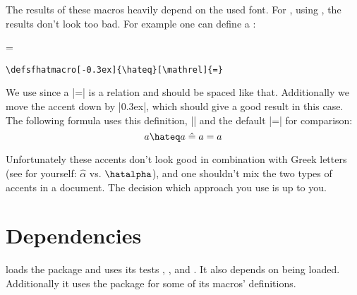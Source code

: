 The results of these macros heavily depend on the used font. For
, using , the results don't look too bad. For
example one can define a :

\begingroup
{}\hateq[\mathrel]=
\begin{verbatim}
\defsfhatmacro[-0.3ex]{\hateq}[\mathrel]{=}
\end{verbatim}%
We use  since a |=| is a relation and should be spaced like that.
Additionally we move the accent down by |0.3ex|, which should give a good result
in this case. The following formula uses this  definition,
|\mathrel{\hat{=}}| and the default |=| for comparison:
\begin{equation*}
  a\hateq a \mathrel{\hat{=}} a = a
\end{equation*}
\endgroup

Unfortunately these accents don't look good in combination with Greek letters
(see for yourself: $\hat{\alpha}$ vs.
\begingroup{}\hatalpha\alpha$\hatalpha$\endgroup), and one
shouldn't mix the two types of accents in a document. The decision which
approach you use is up to you.

\section{Dependencies}
 loads the  package and uses its tests
, ,  and
. It also depends on  being loaded.
Additionally it uses the  package for some of its macros'
definitions.

